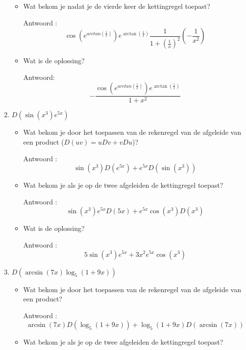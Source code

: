 \begin{enumerate}
\begin{itemize}
		\item Wat bekom je nadat je de vierde keer de kettingregel toepast?
		
		Antwoord :  \[\cos \left(  e^{arctan \left(  \frac{1}{x}  \right) } \right) e^{\arctan \left(  \frac{1}{x}  \right) }\frac{1}{1+\left( \frac{1}{x}  \right)^2}\left( -\frac{1}{x^2}  \right)\]
		
		\item Wat is de oplossing?
		
		Antwoord: \[-\frac{ \cos \left(  e^{arctan \left(  \frac{1}{x}  \right) } \right)  e^{\arctan \left(  \frac{1}{x}  \right) }  }{ 1+x^2  }\]
		
	\end{itemize}
	
	\item $D \left(  \sin \left( x^3  \right) e^{5x}  \right)$
	
	\begin{itemize}
		
		\item Wat bekom je door het toepassen van de rekenregel van de afgeleide van een product ($D(uv)=uDv+vDu$)?
		
		Antwoord : \[\sin \left( x^3  \right)D\left( e^{5x}  \right)+e^{5x}D\left(  \sin \left(  x^3 \right)  \right)\]
		
		\item Wat bekom je als je op de twee afgeleiden de kettingregel toepast?
		
		Antwoord : \[\sin \left( x^3  \right)e^{5x}D(5x)+e^{5x}\cos \left(  x^3 \right)D \left( x^3 \right)\]
		
		\item Wat is de oplossing?
		
		Antwoord : \[5\sin \left( x^3  \right)e^{5x}+3x^2e^{5x}\cos \left(  x^3 \right)\]
		
	\end{itemize}
	
	\item $D \left( \arcsin (7x)\log_5 (1+9x)   \right)$
	
	\begin{itemize}
		
		\item Wat bekom je door het toepassen van de rekenregel van de afgeleide van een product?
		
		Antwoord : \[\arcsin (7x)D \left( \log_5(1+9x)  \right)+\log_5(1+9x)D \left(  \arcsin(7x)  \right)\]
		
		\item Wat bekom je als je op de twee afgeleiden de kettingregel toepast?
		

\end{itemize}
\end{enumerate}
